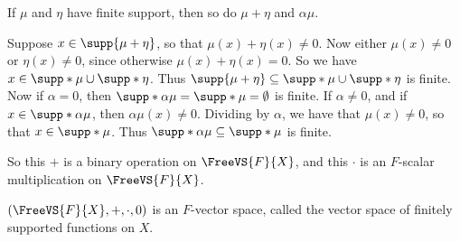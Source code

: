 \begin{claim}
If $\mu$ and $\eta$ have finite support, then so do $\mu+\eta$ and $\alpha\mu$.
\end{claim}
\begin{theproof}
Suppose $x \in \supp{\mu+\eta}$, so that $\mu(x) + \eta(x) \neq 0$. Now either $\mu(x) \neq 0$ or $\eta(x) \neq 0$, since otherwise $\mu(x) + \eta(x) = 0$. So we have $x \in \supp*{\mu} \cup \supp*{\eta}$. Thus $\supp{\mu+\eta} \subseteq \supp*{\mu} \cup \supp*{\eta}$ is finite. Now if $\alpha = 0$, then $\supp*{\alpha\mu} = \supp*{\mu} = \emptyset$ is finite. If $\alpha \neq 0$, and if $x \in \supp*{\alpha\mu}$, then $\alpha\mu(x) \neq 0$. Dividing by $\alpha$, we have that $\mu(x) \neq 0$, so that $x \in \supp*{\mu}$. Thus $\supp*{\alpha\mu} \subseteq \supp*{\mu}$ is finite.
\end{theproof}

So this $+$ is a binary operation on $\FreeVS{F}{X}$, and this $\cdot$ is an $F$-scalar multiplication on $\FreeVS{F}{X}$.

\begin{prp}
$(\FreeVS{F}{X},+,\cdot,0)$ is an $F$-vector space, called the vector space of finitely supported functions on $X$.
\end{prp}

